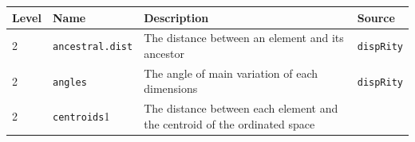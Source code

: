 \documentclass[]{book}
\begin{document}
\begin{longtable}[]{@{}llll@{}}
\toprule
\begin{minipage}[b]{0.07\columnwidth}\raggedright
Level\strut
\end{minipage} & \begin{minipage}[b]{0.07\columnwidth}\raggedright
Name\strut
\end{minipage} & \begin{minipage}[b]{0.64\columnwidth}\raggedright
Description\strut
\end{minipage} & \begin{minipage}[b]{0.10\columnwidth}\raggedright
Source\strut
\end{minipage}\tabularnewline
\midrule
\endhead
\begin{minipage}[t]{0.07\columnwidth}\raggedright
2\strut
\end{minipage} & \begin{minipage}[t]{0.07\columnwidth}\raggedright
\texttt{ancestral.dist}\strut
\end{minipage} & \begin{minipage}[t]{0.64\columnwidth}\raggedright
The distance between an element and its ancestor\strut
\end{minipage} & \begin{minipage}[t]{0.10\columnwidth}\raggedright
\texttt{dispRity}\strut
\end{minipage}\tabularnewline
\begin{minipage}[t]{0.07\columnwidth}\raggedright
2\strut
\end{minipage} & \begin{minipage}[t]{0.07\columnwidth}\raggedright
\texttt{angles}\strut
\end{minipage} & \begin{minipage}[t]{0.64\columnwidth}\raggedright
The angle of main variation of each dimensions\strut
\end{minipage} & \begin{minipage}[t]{0.10\columnwidth}\raggedright
\texttt{dispRity}\strut
\end{minipage}\tabularnewline
\begin{minipage}[t]{0.07\columnwidth}\raggedright
2\strut
\end{minipage} & \begin{minipage}[t]{0.07\columnwidth}\raggedright
\texttt{centroids}1\strut
\end{minipage} & \begin{minipage}[t]{0.64\columnwidth}\raggedright
The distance between each element and the centroid of the ordinated space\strut

\end{minipage}
\end{longtable}
\end{document}
